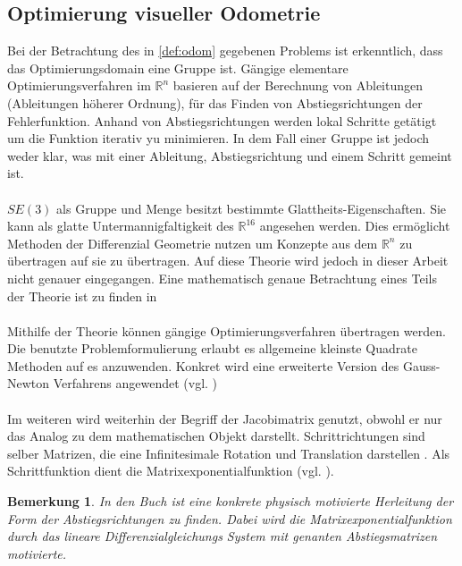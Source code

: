 \documentclass[12pt,DIV=15,BCOR=15mm,twoside,headsepline,abstract=true,listof=totoc,bibliography=totoc]{scrreprt}
\newtheorem{remark}{Bemerkung}[chapter]
\theoremstyle{remark}    %
\begin{document}
    \subsection{Optimierung visueller Odometrie}
    Bei der Betrachtung des in \ref{def:odom} gegebenen Problems ist erkenntlich, dass das Optimierungsdomain eine Gruppe ist.
    Gängige elementare Optimierungsverfahren im $\mathbb{R}^n$ basieren auf der Berechnung von
    Ableitungen (Ableitungen höherer Ordnung), für das Finden von Abstiegsrichtungen der Fehlerfunktion. Anhand von Abstiegsrichtungen werden lokal
    Schritte getätigt um die Funktion iterativ yu minimieren.
    In dem Fall einer Gruppe ist jedoch weder klar, was mit einer Ableitung, Abstiegsrichtung und einem Schritt gemeint ist. \\\\
    $SE(3)$ als Gruppe und Menge besitzt bestimmte Glattheits-Eigenschaften. Sie kann als glatte Untermannigfaltigkeit des $\mathbb{R}^{16}$ angesehen werden. 
    Dies ermöglicht Methoden der Differenzial Geometrie nutzen um Konzepte aus dem $\mathbb{R}^n$ zu übertragen auf sie zu übertragen. 
    Auf diese Theorie wird jedoch in dieser Arbeit nicht genauer eingegangen. Eine mathematisch genaue Betrachtung eines Teils der Theorie ist zu finden in 
    \cite[Kap.9]{Lueck2005}\cite[Kap.8.4]{Absil2008}\cite[Kap.2] {Murray1994}\cite[Apd.A]{Murray1994}\\\\
    Mithilfe der Theorie können gängige Optimierungsverfahren übertragen werden. Die benutzte Problemformulierung erlaubt es allgemeine kleinste Quadrate 
    Methoden auf es anzuwenden. Konkret wird eine erweiterte Version des Gauss-Newton Verfahrens angewendet (vgl. \cite[Kap.8.4]{Absil2008})\\\\
    Im weiteren wird weiterhin der Begriff der Jacobimatrix genutzt, obwohl er nur das Analog zu dem mathematischen Objekt darstellt.
    Schrittrichtungen sind selber Matrizen, die eine Infinitesimale Rotation und Translation darstellen . Als Schrittfunktion 
    dient die Matrixexponentialfunktion (vgl. \cite[Kap.2] {Murray1994}).
    \begin{remark}
    In den Buch \cite[Kap.2] {Murray1994} ist eine konkrete physisch motivierte Herleitung der Form der Abstiegsrichtungen zu finden.
    Dabei wird die Matrixexponentialfunktion durch das lineare Differenzialgleichungs System mit genanten Abstiegsmatrizen motivierte.
    \end{remark}
\end{document}
